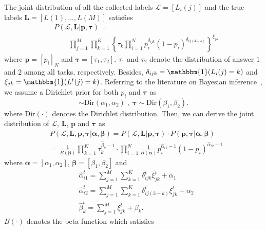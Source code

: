 \documentclass{article}
\begin{document}
The joint distribution of all the collected labels $\mathcal{L}=[L_i(j)]$ and the true labels $\bm{L}=[L(1),\ldots, L(M)]$ satisfies 
\begin{equation}
\begin{split}
    &P(\mathcal{L},\bm{L}| \bm{p}, \bm{\tau})=\\ &\qquad \prod_{j=1}^{M}\prod_{k=1}^{K}\left\{\tau_{k}\prod_{i=1}^{N}p_i^{\delta_{ijk}}(1-p_i)^{\delta_{ij(3-k)}} \right\}^{\xi_{jk}}
\end{split}
\end{equation}
where $\bm{p}=[p_i]_N$ and $\bm{\tau}=[\tau_1,\tau_2]$. $\tau_1$ and $\tau_2$ denote the distribution of answer $1$ and $2$ among all tasks, respectively.
Besides,  $\delta_{ijk}=\mathbbm{1}(L_i(j)=k)$ and $\xi_{jk}= \mathbbm{1}(L^{t}(j)=k)$.
Referring to the literature on Bayesian inference~\cite{liu2012variational}, we assume a Dirichlet prior for both $p_i$ and $\bm{\tau}$ as
\begin{equation}
[p_{i}, 1-p_i]\sim \textrm{Dir}(\alpha_{1},\alpha_{2})\;,\; \bm{\tau}\sim \textrm{Dir}(\beta_{1},\beta_{2}).
\end{equation}
where $\textrm{Dir}(\cdot)$ denotes the Dirichlet distribution. Then, we can derive the joint distribution of $\mathcal{L}$, $\bm{L}$, $\bm{p}$ and $\bm{\tau}$ as
\begin{equation}
\label{JointDist2}
\begin{split}
&P(\mathcal{L},\bm{L},\bm{p}, \bm{\tau}|\bm{\alpha}, \bm{\beta})=P(\mathcal{L},\bm{L}|\bm{p}, \bm{\tau})\cdot P(\bm{p}, \bm{\tau}|\bm{\alpha}, \bm{\beta})\\
&=\frac{1}{B(\bm{\beta})}\prod_{k=1}^{K}\tau_k^{\hat{\beta}_k-1}\cdot\prod_{i=1}^{N}\frac{1}{B(\bm{\alpha})}p_i^{\hat{\alpha}_{i1}-1}(1-p_i)^{\hat{\alpha}_{i2}-1}
\end{split}
\end{equation}
where $\bm{\alpha}=[\alpha_1,\alpha_2]$, $\bm{\beta}=[\beta_1,\beta_2]$ and
\begin{equation}
\begin{split}
&\hat{\alpha}^{t}_{i1}={\sum}_{j=1}^{M}{\sum}_{k=1}^{K}\delta^{t}_{ijk}\xi^{t}_{jk}+\alpha_{1}\\
&\hat{\alpha}^{t}_{i2}={\sum}_{j=1}^{M}{\sum}_{k=1}^{K}\delta^{t}_{ij(3-k)}\xi^{t}_{jk}+\alpha_{2}\\
&\hat{\beta}^{t}_k={\sum}_{j=1}^{M}\xi^{t}_{jk}+\beta_{k}.
\end{split}
\end{equation}
$B(\cdot)$ denotes the beta function which satisfies
\end{document}
